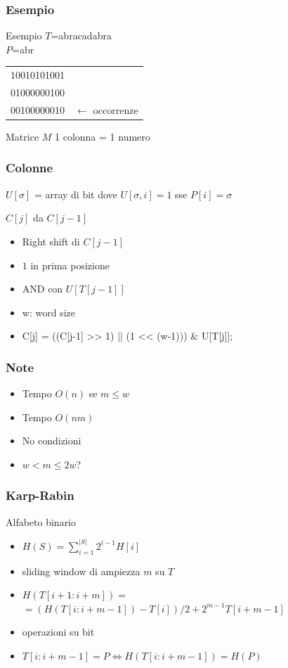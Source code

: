 \begin{frame}
\frametitle{Esempio}
\begin{block}{Esempio}
$T$=abracadabra\\
$P$=abr
\end{block}

\begin{center}
\begin{tabular}[l]{ll}
10010101001\\
01000000100\\
00100000010&$\leftarrow$ \alert{occorrenze}\\%
\end{tabular}
\end{center}

\begin{block}{Matrice $M$}
1 colonna = 1 numero
\end{block}
\end{frame}

\begin{frame}[fragile]
\frametitle{Colonne}
$U[\sigma]$ = array di bit dove $U[\sigma,i]=1$ sse $P[i]=\sigma$

\begin{block}{$C[j]$ da $C[j-1]$}
\begin{itemize}
\item
Right shift di $C[j-1]$
\item
$1$ in prima posizione
\item
AND con $U[T[j-1]]$
\item
\alert{w}: word size
\item
C[j] = ((C[j-1] >> 1) || (1 << (w-1))) \& U[T[j]];
\end{itemize}
\end{block}
\end{frame}

\begin{frame}[fragile]
\frametitle{Note}
\begin{itemize}
\item
Tempo $O(n)$ se $m\le w$
\item
Tempo $O(nm)$
\item
No condizioni
\item
$w<m\le 2w$?
\end{itemize}
\end{frame}

\begin{frame}[fragile]
\frametitle{Karp-Rabin}
\begin{block}{Alfabeto binario}
\begin{itemize}
\item
$H(S)=\sum_{i=1}^{|S|} 2^{i-1}H[i]$
\item
sliding window di ampiezza $m$ su $T$
\item
$H(T[i+1:i+m]) =$\\
$=\left(H(T[i:i+m-1]) - T[i] \right) / 2 + 2^{m-1}T[i+m-1]$
\item
operazioni su bit
\item
$T[i:i+m-1]=P \Leftrightarrow H(T[i:i+m-1])=H(P)$
\end{itemize}
\end{block}
\end{frame}

